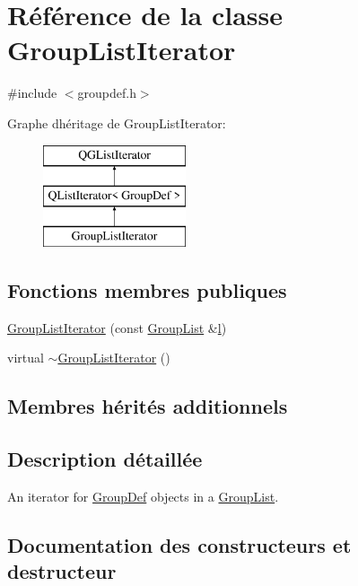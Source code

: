\hypertarget{class_group_list_iterator}{}\section{Référence de la classe Group\+List\+Iterator}
\label{class_group_list_iterator}


{\ttfamily \#include $<$groupdef.\+h$>$}

Graphe d\textquotesingle{}héritage de Group\+List\+Iterator\+:\begin{figure}[H]
\begin{center}
\leavevmode
\includegraphics[height=3.000000cm]{class_group_list_iterator}
\end{center}
\end{figure}
\subsection*{Fonctions membres publiques}
\begin{DoxyCompactItemize}
\item 
\hyperlink{class_group_list_iterator_a8b569b278f3287e4a3b7dd3f1cf91227}{Group\+List\+Iterator} (const \hyperlink{class_group_list}{Group\+List} \&\hyperlink{060__command__switch_8tcl_aff56f84b49947b84b2a304f51cf8e678}{l})
\item 
virtual \hyperlink{class_group_list_iterator_a1bf214b5b208c0e030f265d84fb056f1}{$\sim$\+Group\+List\+Iterator} ()
\end{DoxyCompactItemize}
\subsection*{Membres hérités additionnels}


\subsection{Description détaillée}
An iterator for \hyperlink{class_group_def}{Group\+Def} objects in a \hyperlink{class_group_list}{Group\+List}. 

\subsection{Documentation des constructeurs et destructeur}
\hypertarget{class_group_list_iterator_a8b569b278f3287e4a3b7dd3f1cf91227}{}
